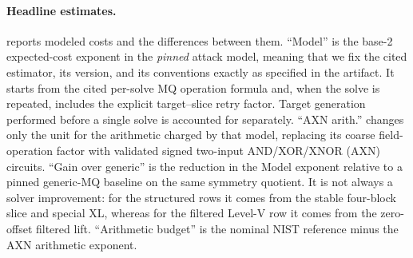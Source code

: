 \documentclass[11pt]{article}
\begin{document}
\paragraph{Headline estimates.}
 reports modeled costs and the differences between them.
``Model'' is the base-2 expected-cost exponent in the \emph{pinned} attack
model, meaning that we fix the cited estimator, its version, and its conventions
exactly as specified in the artifact.  It starts from the cited per-solve MQ
operation formula and, when the solve is repeated, includes
the explicit target--slice retry factor.  Target generation performed before a
single solve is accounted for separately.  ``AXN arith.'' changes only the unit
for the arithmetic charged by that model, replacing its coarse field-operation
factor with validated signed two-input AND/XOR/XNOR (AXN) circuits.  ``Gain over generic'' is the reduction in the Model exponent relative to a pinned generic-MQ
baseline on the same symmetry quotient.  It is not always a solver improvement: for the structured rows it
comes from the stable four-block slice and special XL, whereas for the filtered
Level-V row it comes from the zero-offset filtered lift.  ``Arithmetic budget''
is the nominal NIST reference minus the AXN arithmetic exponent.
\end{document}
